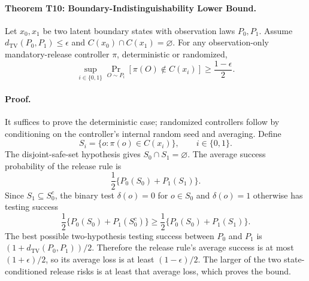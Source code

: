 \paragraph{Theorem T10: Boundary-Indistinguishability Lower Bound.}
Let \(x_0,x_1\) be two latent boundary states with observation laws \(P_0,P_1\).
Assume \(d_{\mathrm{TV}}(P_0,P_1)\le\epsilon\) and
\(C(x_0)\cap C(x_1)=\varnothing\). For any observation-only mandatory-release
controller \(\pi\), deterministic or randomized,
\[
  \sup_{i\in\{0,1\}}\Pr_{O\sim P_i}[\pi(O)\notin C(x_i)]
  \ge \frac{1-\epsilon}{2}.
\]

\paragraph{Proof.}
It suffices to prove the deterministic case; randomized controllers follow by
conditioning on the controller's internal random seed and averaging. Define
\[
  S_i=\{o:\pi(o)\in C(x_i)\},\qquad i\in\{0,1\}.
\]
The disjoint-safe-set hypothesis gives \(S_0\cap S_1=\varnothing\). The average
success probability of the release rule is
\[
  \frac12\{P_0(S_0)+P_1(S_1)\}.
\]
Since \(S_1\subseteq S_0^c\), the binary test
\(\delta(o)=0\) for \(o\in S_0\) and \(\delta(o)=1\) otherwise has testing
success
\[
  \frac12\{P_0(S_0)+P_1(S_0^c)\}
  \ge
  \frac12\{P_0(S_0)+P_1(S_1)\}.
\]
The best possible two-hypothesis testing success between \(P_0\) and \(P_1\) is
\((1+d_{\mathrm{TV}}(P_0,P_1))/2\). Therefore the release rule's average success
is at most \((1+\epsilon)/2\), so its average loss is at least
\((1-\epsilon)/2\). The larger of the two state-conditioned release risks is at
least that average loss, which proves the bound.
